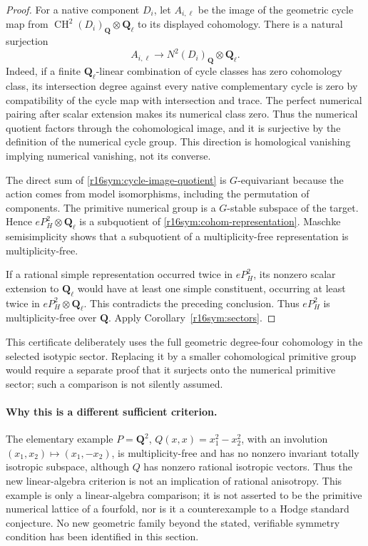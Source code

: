 \begin{proof}
For a native component $D_i$, let $A_{i,\ell}$ be the image
of the geometric cycle map from
$\operatorname{CH}^2(D_i)_{\mathbf Q}\otimes\mathbf Q_\ell$
to its displayed cohomology.  There is a natural surjection
\[
                  A_{i,\ell}\longrightarrow
                         N^2(D_i)_{\mathbf Q}\otimes\mathbf Q_\ell.
\tag{ER16.10}\label{r16sym:cycle-image-quotient}
\]
Indeed, if a finite $\mathbf Q_\ell$-linear combination of
cycle classes has zero cohomology class, its intersection
degree against every native complementary cycle is zero
by compatibility of the cycle map with intersection and
trace.  The perfect numerical pairing after scalar
extension makes its numerical class zero.  Thus the
numerical quotient factors through the cohomological
image, and it is surjective by the definition of the
numerical cycle group.  This direction is homological
vanishing implying numerical vanishing, not its converse.

The direct sum of \eqref{r16sym:cycle-image-quotient} is
$G$-equivariant because the action comes from model
isomorphisms, including the permutation of components.
The primitive numerical group is a $G$-stable subspace
of the target.  Hence $eP_H^2\otimes\mathbf Q_\ell$ is
a subquotient of \eqref{r16sym:cohom-representation}.
Maschke semisimplicity shows that a subquotient of a
multiplicity-free representation is multiplicity-free.

If a rational simple representation occurred twice in
$eP_H^2$, its nonzero scalar extension to $\mathbf Q_\ell$
would have at least one simple constituent, occurring
at least twice in $eP_H^2\otimes\mathbf Q_\ell$.
This contradicts the preceding conclusion.  Thus
$eP_H^2$ is multiplicity-free over $\mathbf Q$.
Apply Corollary~\ref{r16sym:sectors}.
\end{proof}

This certificate deliberately uses the full geometric
degree-four cohomology in the selected isotypic sector.
Replacing it by a smaller cohomological primitive group
would require a separate proof that it surjects onto the
numerical primitive sector; such a comparison is not
silently assumed.

\paragraph{Why this is a different sufficient criterion.}
The elementary example
$P=\mathbf Q^2$, $Q(x,x)=x_1^2-x_2^2$, with an involution
$(x_1,x_2)\mapsto(x_1,-x_2)$, is multiplicity-free and has
no nonzero invariant totally isotropic subspace, although
$Q$ has nonzero rational isotropic vectors.  Thus the new
linear-algebra criterion is not an implication of rational
anisotropy.  This example is only a linear-algebra comparison;
it is not asserted to be the primitive numerical lattice
of a fourfold, nor is it a counterexample to a Hodge
standard conjecture.  No new geometric family beyond the
stated, verifiable symmetry condition has been identified
in this section.

